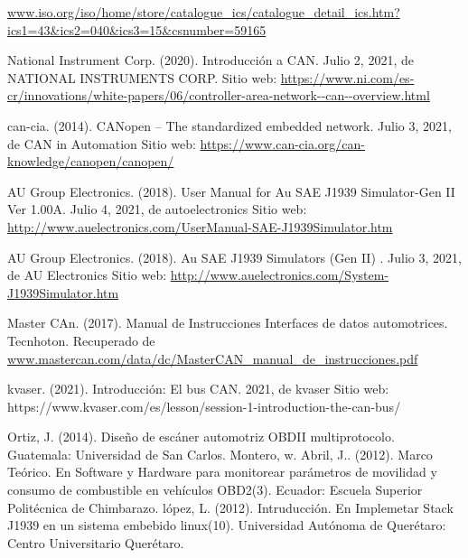 \begin{thebibliography}{99}
 \url{www.iso.org/iso/home/store/catalogue_ics/catalogue_detail_ics.htm?ics1=43&ics2=040&ics3=15&csnumber=59165}

 National Instrument Corp. (2020). Introducción a CAN. Julio 2, 2021, de NATIONAL INSTRUMENTS CORP. Sitio web: \url{ https://www.ni.com/es-cr/innovations/white-papers/06/controller-area-network--can--overview.html}

 can-cia. (2014). CANopen – The standardized embedded network. Julio 3, 2021, de CAN in Automation Sitio web: \url{ https://www.can-cia.org/can-knowledge/canopen/canopen/}

 AU Group Electronics. (2018). User Manual for Au SAE J1939 Simulator-Gen II Ver 1.00A. Julio 4, 2021, de autoelectronics Sitio web: \url{ http://www.auelectronics.com/UserManual-SAE-J1939Simulator.htm}


 AU Group Electronics. (2018). Au SAE J1939 Simulators (Gen II) . Julio 3, 2021, de AU Electronics Sitio web: \url{ http://www.auelectronics.com/System-J1939Simulator.htm}


 Master CAn. (2017). Manual de Instrucciones Interfaces de datos automotrices. Tecnhoton. Recuperado de  \url{www.mastercan.com/data/dc/MasterCAN_manual_de_instrucciones.pdf}

  kvaser. (2021). Introducción: El bus CAN. 2021, de kvaser Sitio web: https://www.kvaser.com/es/lesson/session-1-introduction-the-can-bus/

 Ortiz, J. (2014). Diseño de escáner automotriz OBDII multiprotocolo. Guatemala: Universidad de San Carlos.
 Montero, w. Abril, J.. (2012). Marco Teórico. En Software y Hardware para monitorear parámetros de movilidad y consumo de combustible en vehículos OBD2(3). Ecuador: Escuela Superior Politécnica de Chimbarazo. 
 lópez, L. (2012). Intruducción. En Implemetar Stack J1939 en un sistema embebido linux(10). Universidad Autónoma de Querétaro: Centro Universitario Querétaro.


\end{thebibliography}
